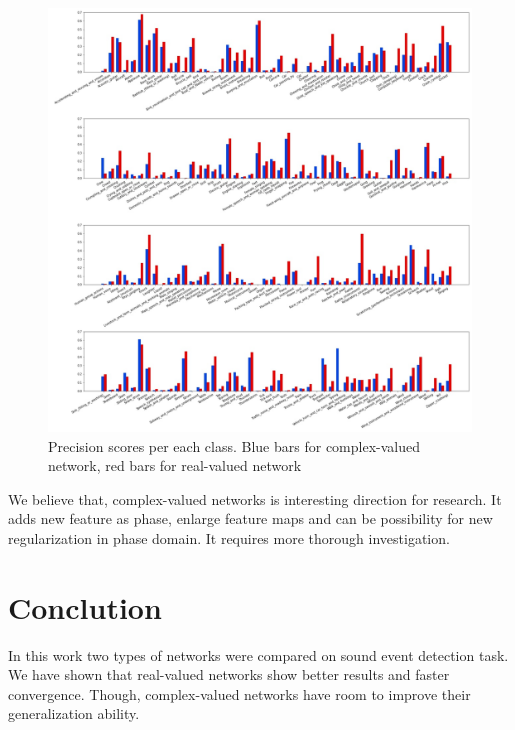 \documentclass{article}
\begin{document}
\begin{figure}
	\centering
	\includegraphics[width=0.8\linewidth]{assets/AP.jpg}
	\caption{Precision scores per each class. Blue bars for complex-valued network, red bars for real-valued network}
	\label{fig:apperclass}
\end{figure}

We believe that, complex-valued networks is interesting direction for research. It adds new feature as phase, enlarge feature maps and 
can be possibility for new regularization in phase domain. It requires more thorough investigation.

\section{Conclution}
In this work two types of networks were compared on sound event detection task. We have shown that real-valued networks show better results and faster convergence. Though, 
complex-valued networks have room to improve their generalization ability.


  
\end{document}
